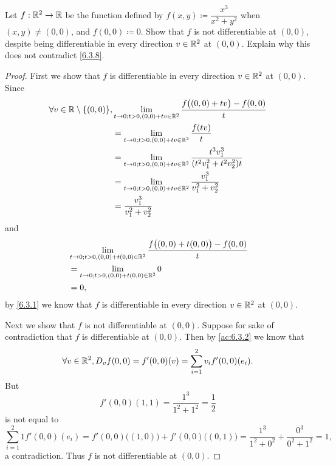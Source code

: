 \begin{ex}\label{ex:6.3.3}
  Let \(f : \mathbb{R}^2 \to \mathbb{R}\) be the function defined by \(f(x, y) \coloneqq \dfrac{x^3}{x^2 + y^2}\) when \((x, y) \neq (0, 0)\), and \(f(0, 0) \coloneqq 0\).
  Show that \(f\) is not differentiable at \((0, 0)\), despite being differentiable in every direction \(v \in \mathbb{R}^2\) at \((0, 0)\).
  Explain why this does not contradict \cref{6.3.8}.
\end{ex}

\begin{proof}
  First we show that \(f\) is differentiable in every direction \(v \in \mathbb{R}^2\) at \((0, 0)\).
  Since
  \begin{align*}
    \forall v \in \R \setminus \set{(0, 0)}, & \lim_{t \to 0 ; t > 0, (0, 0) + tv \in \R^2} \dfrac{f\big((0, 0) + tv\big) - f(0, 0)}{t}    \\
                                             & = \lim_{t \to 0 ; t > 0, (0, 0) + tv \in \R^2} \dfrac{f(tv)}{t}                             \\
                                             & = \lim_{t \to 0 ; t > 0, (0, 0) + tv \in \R^2} \dfrac{t^3 v_1^3}{(t^2 v_1^2 + t^2 v_2^2) t} \\
                                             & = \lim_{t \to 0 ; t > 0, (0, 0) + tv \in \R^2} \dfrac{v_1^3}{v_1^2 + v_2^2}                 \\
                                             & = \dfrac{v_1^3}{v_1^2 + v_2^2}
  \end{align*}
  and
  \begin{align*}
     & \lim_{t \to 0 ; t > 0, (0, 0) + t (0, 0) \in \mathbb{R}^2} \dfrac{f\big((0, 0) + t(0, 0)\big) - f(0, 0)}{t} \\
     & = \lim_{t \to 0 ; t > 0, (0, 0) + t (0, 0) \in \mathbb{R}^2} 0                                              \\
     & = 0,
  \end{align*}
  by \cref{6.3.1} we know that \(f\) is differentiable in every direction \(v \in \mathbb{R}^2\) at \((0, 0)\).

  Next we show that \(f\) is not differentiable at \((0, 0)\).
  Suppose for sake of contradiction that \(f\) is differentiable at \((0, 0)\).
  Then by \cref{ac:6.3.2} we know that
  \[
    \forall v \in \mathbb{R}^2, D_v f(0, 0) = f'(0, 0)(v) = \sum_{i = 1}^2 v_i f'(0, 0)(e_i).
  \]
  But
  \[
    f'(0, 0)(1, 1) = \dfrac{1^3}{1^2 + 1^2} = \dfrac{1}{2}
  \]
  is not equal to
  \[
    \sum_{i = 1}^2 1 f'(0, 0)(e_i) = f'(0, 0)\big((1, 0)\big) + f'(0, 0)\big((0, 1)\big) = \dfrac{1^3}{1^2 + 0^2} + \dfrac{0^3}{0^2 + 1^2} = 1,
  \]
  a contradiction.
  Thus \(f\) is not differentiable at \((0, 0)\).


\end{proof}
